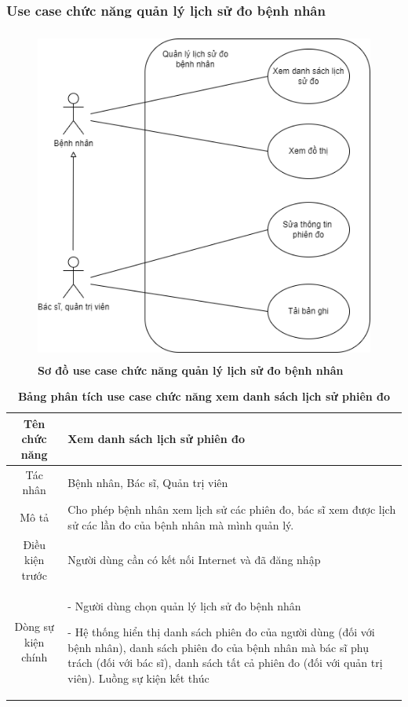 \subsubsection{Use case chức năng quản lý lịch sử đo bệnh nhân}
  \begin{figure}[H]
    \centering
    \includegraphics[width=12cm,height=11cm]{Images/use_case/use_case_view_history_record.png}
    \caption[Sơ đồ use case chức năng quản lý lịch sử đo bệnh nhân]{\bfseries \fontsize{12pt}{0pt}
    \selectfont Sơ đồ use case chức năng quản lý lịch sử đo bệnh nhân}
    \label{use_case_view_history_record} %
  \end{figure}

  \begin{table}[H]
    \caption{\bfseries \fontsize{12pt}{0pt}\selectfont Bảng phân tích use case chức năng xem danh sách lịch sử phiên đo}
    \centering
    \begin{tabularx}{0.9\textwidth}{|c|X|}
      \hline
      \textbf{Tên chức năng} & \textbf{Xem danh sách lịch sử phiên đo} \\
      \hline
      Tác nhân & Bệnh nhân, Bác sĩ, Quản trị viên \\
      \hline
      Mô tả & Cho phép bệnh nhân xem lịch sử các phiên đo, bác sĩ xem được lịch sử các lần đo của bệnh nhân
      mà mình quản lý.\\
      \hline
      Điều kiện trước & Người dùng cần có kết nối Internet và đã đăng nhập \\
      \hline
      Dòng sự kiện chính & 
        - Người dùng chọn quản lý lịch sử đo bệnh nhân

        - Hệ thống hiển thị danh sách phiên đo của người dùng (đối với bệnh nhân), danh sách phiên đo của 
        bệnh nhân mà bác sĩ phụ trách (đối với bác sĩ), danh sách tất cả phiên đo (đối với quản trị viên). Luồng sự kiện 
        kết thúc
        \\
      \hline
    \end{tabularx}
  \end{table}

